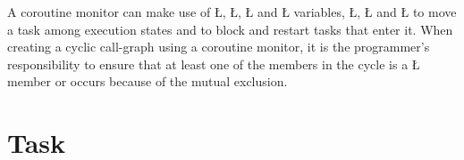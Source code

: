 \documentclass[openright,twoside]{report}
\begin{document}
A coroutine monitor can make use of \LGinlinetrue\LGbegin\lgrinde\L{}\endlgrinde\LGend{}, \LGinlinetrue\LGbegin\lgrinde\L{}\endlgrinde\LGend{}, \LGinlinetrue\LGbegin\lgrinde\L{}\endlgrinde\LGend{} and \LGinlinetrue\LGbegin\lgrinde\L{}\endlgrinde\LGend{} variables, \LGinlinetrue\LGbegin\lgrinde\L{}\endlgrinde\LGend{}, \LGinlinetrue\LGbegin\lgrinde\L{}\endlgrinde\LGend{} and \LGinlinetrue\LGbegin\lgrinde\L{}\endlgrinde\LGend{} to move a task among execution states and to block and restart tasks that enter it.
When creating a cyclic call-graph using a coroutine monitor, it is the programmer's responsibility to ensure that at least one of the members in the cycle is a \LGinlinetrue\LGbegin\lgrinde\L{}\endlgrinde\LGend{} member or  occurs because of the mutual exclusion.


\section{Task}
\label{s:Task}
\end{document}
